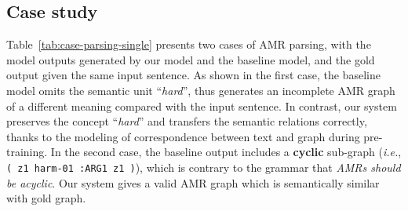 \documentclass[11pt]{article}
\begin{document}
\subsection{Case study}

Table~\ref{tab:case-parsing-single} presents two cases of AMR parsing, with the model outputs generated by our model and the baseline model, and the gold output given the same input sentence. 
As shown in the first case, the baseline model omits the semantic unit ``\textit{hard}'', thus generates an incomplete AMR graph of a different meaning compared with the input sentence.
In contrast, our system preserves the concept ``\textit{hard}'' and transfers the semantic relations correctly, thanks to the modeling of correspondence between text and graph during pre-training.
In the second case, the baseline output includes a \textbf{cyclic} sub-graph (\textit{i.e.}, \texttt{( z1 harm-01 :ARG1 z1 )}), which is contrary to the grammar that \textit{AMRs should be acyclic}. 
Our system gives a valid AMR graph which is semantically similar with gold graph. 
\end{document}
